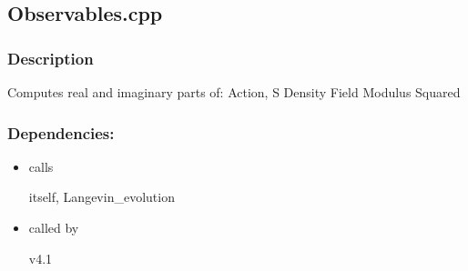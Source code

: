 \subsection{Observables.cpp}
\subsubsection{Description}
Computes real and imaginary parts of:
Action, S
Density
Field Modulus Squared


\subsubsection{Dependencies:}
\begin{itemize}
\item calls 

itself, Langevin\_evolution

\item called by

v4.1

\end{itemize}

